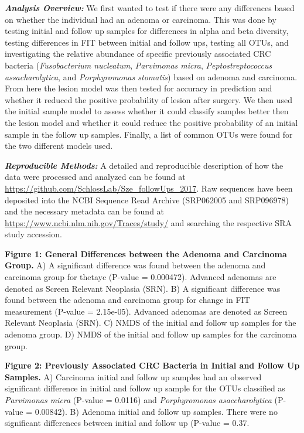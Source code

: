 \documentclass[12pt,]{article}
\begin{document}
\textbf{\emph{Analysis Overview:}} We first wanted to test if there were
any differences based on whether the individual had an adenoma or
carcinoma. This was done by testing initial and follow up samples for
differences in alpha and beta diversity, testing differences in FIT
between initial and follow ups, testing all OTUs, and investigating the
relative abundance of specific previously associated CRC bacteria
(\emph{Fusobacterium nucleatum}, \emph{Parvimonas micra},
\emph{Peptostreptococcus assacharolytica}, and \emph{Porphyromonas
stomatis}) based on adenoma and carcinoma. From here the lesion model
was then tested for accuracy in prediction and whether it reduced the
positive probability of lesion after surgery. We then used the initial
sample model to assess whether it could classify samples better then the
lesion model and whether it could reduce the positive probability of an
initial sample in the follow up samples. Finally, a list of common OTUs
were found for the two different models used.

\textbf{\emph{Reproducible Methods:}} A detailed and reproducible
description of how the data were processed and analyzed can be found at
\url{https://github.com/SchlossLab/Sze_followUps_2017}. Raw sequences
have been deposited into the NCBI Sequence Read Archive (SRP062005 and
SRP096978) and the necessary metadata can be found at
\url{https://www.ncbi.nlm.nih.gov/Traces/study/} and searching the
respective SRA study accession.

\newpage

\textbf{Figure 1: General Differences between the Adenoma and Carcinoma
Group.} A) A significant difference was found between the adenoma and
carcinoma group for thetayc (P-value = 0.000472). Advanced adenomas are
denoted as Screen Relevant Neoplasia (SRN). B) A significant difference
was found between the adenoma and carcinoma group for change in FIT
measurement (P-value = 2.15e-05). Advanced adenomas are denoted as
Screen Relevant Neoplasia (SRN). C) NMDS of the initial and follow up
samples for the adenoma group. D) NMDS of the initial and follow up
samples for the carcinoma group.

\textbf{Figure 2: Previously Associated CRC Bacteria in Initial and
Follow Up Samples.} A) Carcinoma initial and follow up samples had an
observed significant difference in initial and follow up sample for the
OTUs classified as \emph{Parvimonas micra} (P-value = 0.0116) and
\emph{Porphyromonas asaccharolytica} (P-value = 0.00842). B) Adenoma
initial and follow up samples. There were no significant differences
between initial and follow up (P-value = 0.37.
\end{document}

